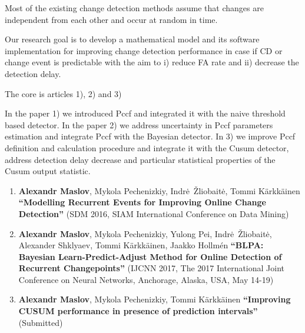 Most of the existing change detection methods assume that changes are independent from each other and occur at random in time.



Our research goal is to develop a mathematical model and its software implementation for improving change detection performance in case if CD or change event is predictable with the aim to i) reduce FA rate and ii) decrease the detection delay. 


The core is articles 1), 2) and 3)

In the paper 1) we introduced Pccf and integrated it with the naive threshold based detector.
In the paper 2) we address uncertainty in Pccf parameters estimation and integrate Pccf with the Bayesian detector.
In 3) we improve Pccf definition and calculation procedure and integrate it with the Cusum detector, address detection delay decrease and particular statistical properties of the Cusum output statistic.

\begin{enumerate}[leftmargin=0.2cm]

  \item \textbf{Alexandr Maslov}, Mykola Pechenizkiy, Indr\.e~\v{Z}liobait\.e, Tommi K\"{a}rkk\"{a}inen \textbf{``Modelling Recurrent Events for Improving Online Change Detection''} (SDM 2016, SIAM International Conference on Data Mining)

  \item \textbf{Alexandr Maslov}, Mykola Pechenizkiy, Yulong Pei, Indr\.e~\v{Z}liobait\.e, Alexander Shklyaev, Tommi K\"{a}rkk\"{a}inen, Jaakko Hollm{\'e}n \textbf{``BLPA: Bayesian Learn-Predict-Adjust Method for Online  Detection of Recurrent Changepoints''} (IJCNN 2017, The 2017 International Joint Conference on Neural Networks, Anchorage, Alaska, USA, May 14-19)

  \item \textbf{Alexandr Maslov}, Mykola Pechenizkiy, Tommi K\"{a}rkk\"{a}inen \textbf{``Improving CUSUM performance in presence of prediction intervals''} (Submitted)

\end{enumerate}

